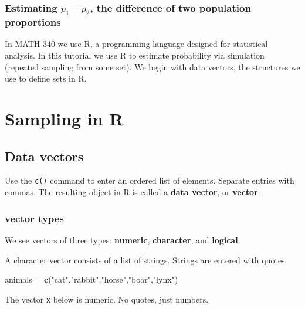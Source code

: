 \documentclass[
]{book}
\newenvironment{Shaded}{\begin{snugshade}}{\end{snugshade}}
\newcommand{\FunctionTok}[1]{\textcolor[rgb]{0.13,0.29,0.53}{\textbf{#1}}}
\newcommand{\NormalTok}[1]{#1}
\newcommand{\OtherTok}[1]{\textcolor[rgb]{0.56,0.35,0.01}{#1}}
\newcommand{\StringTok}[1]{\textcolor[rgb]{0.31,0.60,0.02}{#1}}
\theoremstyle{definition}
\theoremstyle{definition}
\theoremstyle{definition}
\theoremstyle{definition}
\theoremstyle{remark}
\begin{document}
\subsection{\texorpdfstring{Estimating \(p_1 - p_2\), the difference of two population proportions}{Estimating p\_1 - p\_2, the difference of two population proportions}}\label{estimating-p_1---p_2-the-difference-of-two-population-proportions}

\appendix


In MATH 340 we use R, a programming language designed for statistical analysis. In this tutorial we use R to estimate probability via simulation (repeated sampling from some set). We begin with data vectors, the structures we use to define sets in R.

\chapter{Sampling in R}\label{sampling-in-r}

\section{Data vectors}\label{vectors-R}

Use the \texttt{c()} command to enter an ordered list of elements. Separate entries with commas. The resulting object in R is called a \textbf{data vector}, or \textbf{vector}.

\subsection{vector types}\label{vector-types}

We see vectors of three types: \textbf{numeric}, \textbf{character}, and \textbf{logical}.

A character vector consists of a list of strings. Strings are entered with quotes.

\begin{Shaded}
\begin{Highlighting}[]
\NormalTok{animals }\OtherTok{=} \FunctionTok{c}\NormalTok{(}\StringTok{"cat"}\NormalTok{,}\StringTok{"rabbit"}\NormalTok{,}\StringTok{"horse"}\NormalTok{,}\StringTok{"boar"}\NormalTok{,}\StringTok{"lynx"}\NormalTok{)}
\end{Highlighting}
\end{Shaded}

The vector \texttt{x} below is numeric. No quotes, just numbers.
\end{document}
